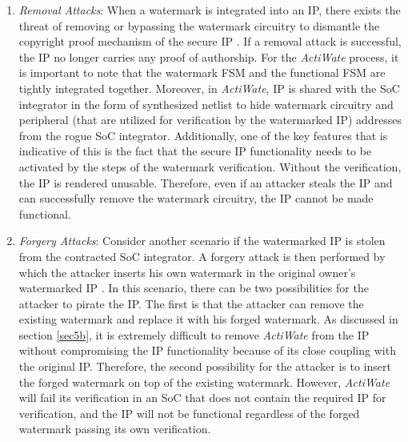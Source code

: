 \documentclass[onecolumn]{IEEEtran}
\begin{document}
\begin{enumerate}
	\item \textit{ Removal Attacks}: When a watermark is integrated into an
	IP, there exists the threat of removing or bypassing the watermark
	circuitry to dismantle the copyright proof mechanism of the secure
	IP \cite{Yasin2020}. If a removal attack is successful, the IP no longer carries any
	proof of authorship. For the \textit{ActiWate} process, it is important to note
	that the watermark FSM and the functional FSM are tightly integrated
	together. Moreover, in \textit{ActiWate}, IP is shared with the SoC integrator
	in the form of synthesized netlist to hide watermark circuitry and
	peripheral (that are utilized for verification by the watermarked IP)
	addresses from the rogue SoC integrator. Additionally, one of the
	key features that is indicative of this is the fact that the secure IP
	functionality needs to be activated by the steps of the watermark
	verification. Without the verification, the IP is rendered unusable.
	Therefore, even if an attacker steals the IP and can successfully
	remove the watermark circuitry, the IP cannot be made functional.
	
	\item \textit{Forgery Attacks}: Consider another scenario if the watermarked
	IP is stolen from the contracted SoC integrator. A forgery attack is
	then performed by which the attacker inserts his own watermark in
	the original owner’s watermarked IP \cite{Karmakar2022}. In this scenario, there can
	be two possibilities for the attacker to pirate the IP. The first is that
	the attacker can remove the existing watermark and replace it with
	his forged watermark. As discussed in section \ref{sec5b}, it is extremely
	difficult to remove \textit{ActiWate} from the IP without compromising the
	IP functionality because of its close coupling with the original IP.
	Therefore, the second possibility for the attacker is to insert the forged
	watermark on top of the existing watermark. However, \textit{ActiWate} will
	fail its verification in an SoC that does not contain the required IP
	for verification, and the IP will not be functional regardless of the
	forged watermark passing its own verification.
	

\end{enumerate}
\end{document}
